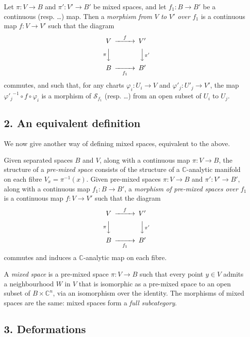 \documentclass[british]{article}
\newcommand{\oldpage}[1]{\marginpar{\footnotesize$\Big\vert$ \textit{p.~#1}}}
\begin{document}
Let \(\pi\colon V\to B\) and \(\pi'\colon V'\to B'\) be mixed spaces,
and let \(f_1\colon B\to B'\) be a continuous (resp. \ldots) map. Then a
\emph{morphism from \(V\) to \(V'\) over \(f_1\)} is a continuous map
\(f\colon V\to V'\) such that the diagram \[
  \begin{CD}
    V @>f>> V'
  \\@V{\pi}VV @VV{\pi'}V
  \\B @>>{f_1}> B'
  \end{CD}
\] commutes, and such that, for any charts \(\varphi_i\colon U_i\to V\)
and \(\varphi'_j\colon U'_j\to V'\), the map
\({\varphi'_j}^{-1}\circ f\circ\varphi_i\) is a morphism of
\(\mathscr{S}_{f_1}\) (resp. \ldots) from an open subset of \(U_i\) to
\(U_j\). \oldpage{2-03}

\subsection*{2. An equivalent definition}\label{two-section-II.2}

We now give another way of defining mixed spaces, equivalent to the
above.

Given separated spaces \(B\) and \(V\), along with a continuous map
\(\pi\colon V\to B\), the structure of a \emph{pre-mixed space} consists
of the structure of a \(\mathbb{C}\)-analytic manifold on each fibre
\(V_x=\pi^{-1}(x)\). Given pre-mixed spaces \(\pi\colon V\to B\) and
\(\pi'\colon V'\to B'\), along with a continuous map
\(f_1\colon B\to B'\), a \emph{morphism of pre-mixed spaces over
\(f_1\)} is a continuous map \(f\colon V\to V'\) such that the diagram
\[
  \begin{CD}
    V @>f>> V'
  \\@V{\pi}VV @VV{\pi'}V
  \\B @>>{f_1}> B'
  \end{CD}
\] commutes and induces a \(\mathbb{C}\)-analytic map on each fibre.

A \emph{mixed space} is a pre-mixed space \(\pi\colon V\to B\) such that
every point \(y\in V\) admits a neighbourhood \(W\) in \(V\) that is
isomorphic as a pre-mixed space to an open subset of
\(B\times\mathbb{C}^n\), via an isomorphism over the identity. The
morphisms of mixed spaces are the same: mixed spaces form a \emph{full
subcategory}.

\subsection*{3. Deformations}\label{two-section-II.3}
\end{document}
